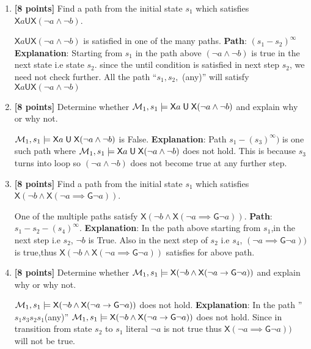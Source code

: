 \documentclass{article}
\def\Forever{\mathord{\mathsf{G}}}
\def\NextX{\mathord{\mathsf{X}}}
\def\Until{\mathrel{\mathsf{U}}}
\begin{document}
\begin{enumerate}
  \item \textbf{[8 points]} Find a path from the initial state $s_1$
    which satisfies $\NextX a \Until \NextX (\neg a \land \neg b)$.
    \begin{answer}
    	$\NextX a \Until \NextX (\neg a \land \neg b)$ is satisfied in one of the many
    	paths.	\newline
    	\textbf{Path}: $(s_1-s_2)^\infty$	\newline
    	\textbf{Explanation}: Starting from $s_1$ in the path above $(\neg a \land \neg b)$
    	is true in the next state i.e state $s_2$. since the until condition is satisfied in next step $s_2$, we need not check further. All the path ``$s_1, s_2,$ (any)'' will satisfy $\NextX a \Until \NextX (\neg a \land \neg b)$
    \end{answer}

  \item \textbf{[8 points]} Determine whether
    ${\cal M}_1, s_1 \models \NextX a \Until \NextX (\neg a \land \neg
    b)$ and explain why or why not.
    \begin{answer}
    	${\cal M}_1, s_1 \models \NextX a \Until \NextX (\neg a \land \neg
    b)$ is False.
    	\newline \textbf{Explanation}: Path $s_1-(s_3)^\infty)$  is one such path where ${\cal M}_1, s_1 \models \NextX a \Until \NextX (\neg a \land \neg b)$ does not hold. This is because $s_3$ turns into loop so $ (\neg a \land \neg
    b)$ does not become true  at any further step.
    \end{answer}

  \item \textbf{[8 points]} Find a path from the initial state $s_1$
    which satisfies
    $\NextX (\neg b \land \NextX(\neg a \implies \Forever \neg a))$.
\begin{answer}
    	One of the multiple paths satisfy $\NextX (\neg b \land \NextX(\neg a \implies \Forever \neg a))$.	\newline
    	\textbf{Path}: $s_1-s_2-(s_4)^\infty$.	\newline
    	\textbf{Explanation}: In the path above starting from $s_1$,in the next step i.e $s_2$, $\neg b$ is True. Also  in the next step of $s_2$ i.e $s_4$, $(\neg a \implies \Forever \neg a))$ is  true,thus $\NextX (\neg b \land \NextX(\neg a \implies \Forever \neg a))$ satisfies for above path.
    	
    \end{answer}
  \item \textbf{[8 points]} Determine whether
    ${\cal M}_1, s_1 \models \NextX (\neg b \land \NextX(\neg a \implies
    \Forever \neg a))$ and explain why or why not.
\begin{answer}
    ${\cal M}_1, s_1 \models \NextX (\neg b \land \NextX(\neg a \implies
    \Forever \neg a))$ does not hold.	\newline
    	\textbf{Explanation}: In the path ''$s_1s_3s_2s_1$(any)'' ${\cal M}_1, s_1 \models \NextX (\neg b \land \NextX(\neg a \implies \Forever \neg a))$ does not hold. Since in transition from state $s_2$ to $s_1$ literal $\neg a$ is not true thus $\NextX(\neg a \implies \Forever \neg a))$ will not be true.
    	

\end{answer}
\end{enumerate}
\end{document}
